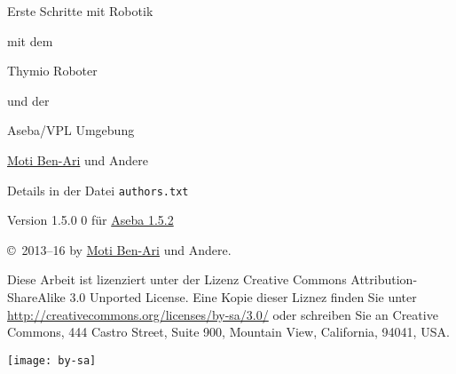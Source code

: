 \thispagestyle{empty}

\begin{center}
\begin{Huge}
\begin{bfseries}
Erste Schritte mit Robotik
\end{bfseries}

mit dem

\begin{bfseries}
Thymio Roboter
\end{bfseries}

und der

\begin{bfseries}
Aseba/VPL Umgebung
\end{bfseries}

\end{Huge}

\vskip 2cm

\begin{LARGE}
\href{http://www.weizmann.ac.il/sci-tea/benari/}{Moti Ben-Ari} und Andere\\
\end{LARGE}
\bigskip
\begin{Large}
Details in der Datei \texttt{authors.txt} 
\end{Large}

\vskip 1cm

\begin{Large}
Version 1.5.0  0 für  \href{https://www.thymio.org/de:start}{Aseba 1.5.2}
\end{Large}

\end{center}

\vfill

\begin{center}
\copyright{}\  2013--16 by \href{http://www.weizmann.ac.il/sci-tea/benari/}{Moti Ben-Ari} und Andere.
\end{center}

Diese Arbeit ist lizenziert unter der Lizenz Creative Commons Attribution-ShareAlike 3.0 Unported License. Eine Kopie dieser Liznez finden Sie unter  \href{http://creativecommons.org/licenses/by-sa/3.0/}{http://creativecommons.org/licenses/by-sa/3.0/}
oder schreiben Sie an Creative Commons, 444 Castro Street, Suite 900,
Mountain View, California, 94041, USA.

\begin{center}
\texttt{[image: by-sa]}
\end{center}

\newpage
\thispagestyle{empty}
\begin{spacing}{0.7}
\tableofcontents
\end{spacing}
\newpage
\setcounter{page}{1}

